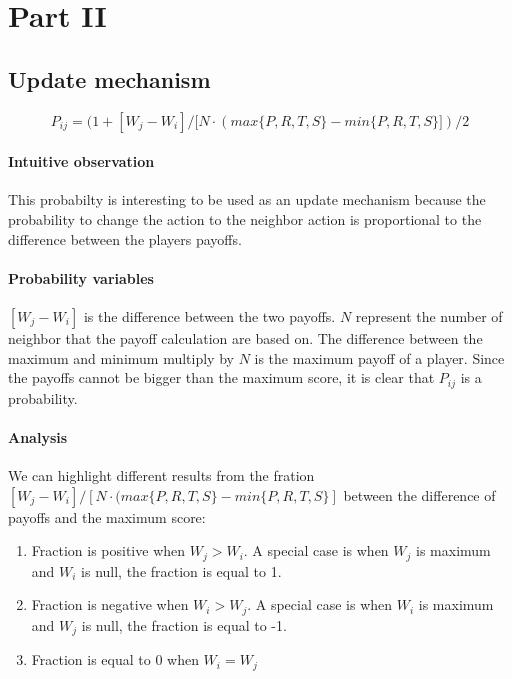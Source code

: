 \documentclass[letterpaper]{article}
\begin{document}
\section{Part II}

\subsection{Update mechanism}

\begin{equation}
    P_{ij} = (1 + [W_j - W_i] / [N\cdot(max\{P, R, T, S\}
    - min\{P, R, T, S\}])/2
\end{equation}

\paragraph{Intuitive observation}

This probabilty is interesting to be used as an update mechanism because
the probability to change the action to the neighbor action is
proportional to the difference between the players payoffs.

\paragraph{Probability variables}

$[W_j - W_i]$ is the difference between the two payoffs.
$N$ represent the number
of neighbor that the payoff calculation are based on. The difference
between the maximum and minimum multiply by $N$ is
the maximum payoff of a player. Since the payoffs cannot be bigger than
the maximum score, it is clear that $P_{ij}$ is a probability.

\paragraph{Analysis}

We can highlight different results from
the fration
$[W_j - W_i] / [N\cdot(max\{P, R, T, S\}
- min\{P, R, T, S\}]$
between the difference of payoffs and the maximum score:

\begin{enumerate}
    \item Fraction is positive when $W_j > W_i$. A special
    case is when $W_j$ is maximum and $W_i$ is null, the fraction is equal to 1.
    \item Fraction is negative when $W_i > W_j$. A special
    case is when $W_i$ is maximum and $W_j$ is null,
    the fraction is equal to -1.
    \item Fraction is equal to 0 when $W_i = W_j$
\end{enumerate}
\end{document}
